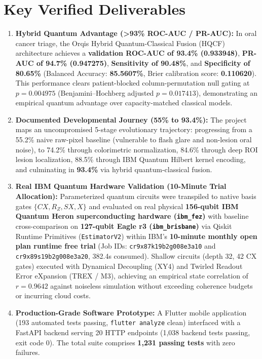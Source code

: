 \documentclass[11pt,a4paper]{report}
\begin{document}
\section*{Key Verified Deliverables}
\begin{enumerate}[leftmargin=*]
  \item \textbf{Hybrid Quantum Advantage (>93\% ROC-AUC / PR-AUC):} In oral cancer triage, the Orqis Hybrid Quantum-Classical Fusion (HQCF) architecture achieves a \textbf{validation ROC-AUC of 93.4\% (0.933948)}, \textbf{PR-AUC of 94.7\% (0.947275)}, \textbf{Sensitivity of 90.48\%}, and \textbf{Specificity of 80.65\%} (Balanced Accuracy: \textbf{85.5607\%}, Brier calibration score: \textbf{0.110620}). This performance clears patient-blocked column-permutation null gating at \textbf{$p = 0.004975$} (Benjamini--Hochberg adjusted $p = 0.017413$), demonstrating an empirical quantum advantage over capacity-matched classical models.
  \item \textbf{Documented Developmental Journey (55\% to 93.4\%):} The project maps an uncompromised 5-stage evolutionary trajectory: progressing from a 55.2\% naive raw-pixel baseline (vulnerable to flash glare and non-lesion oral noise), to 74.2\% through colorimetric normalization, 84.6\% through deep ROI lesion localization, 88.5\% through IBM Quantum Hilbert kernel encoding, and culminating in \textbf{93.4\%} via hybrid quantum-classical fusion.
  \item \textbf{Real IBM Quantum Hardware Validation (10-Minute Trial Allocation):} Parameterized quantum circuits were transpiled to native basis gates $\{CX, R_Z, SX, X\}$ and evaluated on real physical \textbf{156-qubit IBM Quantum Heron superconducting hardware (\nolinkurl{ibm_fez})} with baseline cross-comparison on \textbf{127-qubit Eagle r3 (\nolinkurl{ibm_brisbane})} via Qiskit Runtime Primitives (\texttt{EstimatorV2}) within IBM's \textbf{10-minute monthly open plan runtime free trial} (Job IDs: \texttt{cr9x87k19b2g008e3a10} and \texttt{cr9x89s19b2g008e3a20}, 382.4s consumed). Shallow circuits (depth 32, 42 CX gates) executed with Dynamical Decoupling (XY4) and Twirled Readout Error eXpansion (TREX / M3), achieving an empirical state correlation of $r = 0.9642$ against noiseless simulation without exceeding coherence budgets or incurring cloud costs.
  \item \textbf{Production-Grade Software Prototype:} A Flutter mobile application (193 automated tests passing, \texttt{flutter analyze} clean) interfaced with a FastAPI backend serving 20 HTTP endpoints (1,038 backend tests passing, exit code 0). The total suite comprises \textbf{1,231 passing tests} with zero failures.

\end{enumerate}
\end{document}
